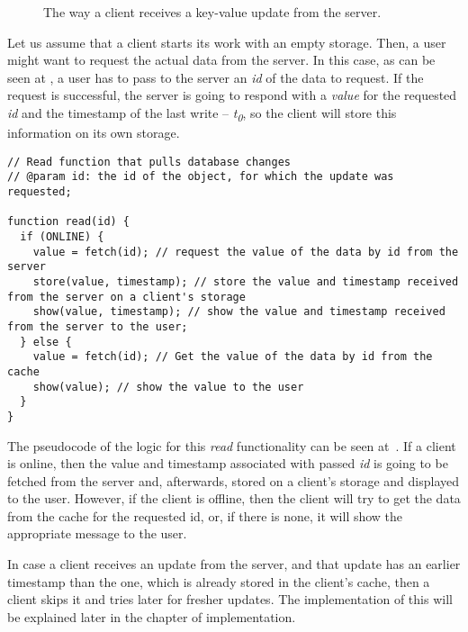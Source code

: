 \begin{figure}[!htb]
    \begin{center}
    \def\svgwidth{\linewidth}
    
    \caption {The way a client receives a key-value update from the server.}
    \label{fig:design2}
\end{center}
\end{figure}

Let us assume that a client starts its work with an empty storage. Then, a user might want to request the actual data from the server. In this case, as can be seen at , a user has to pass to the server an \textit{id} of the data to request. If the request is successful, the server is going to respond with a \textit{value} for the requested \textit{id} and the timestamp of the last write -- \textit{t\textsubscript{0}}, so the client will store this information on its own storage.

\begin{lstlisting}[caption={A pseudocode for requesting the data on a client's side.}, label={lst:read1}]
// Read function that pulls database changes
// @param id: the id of the object, for which the update was requested;

function read(id) {
  if (ONLINE) {
    value = fetch(id); // request the value of the data by id from the server
    store(value, timestamp); // store the value and timestamp received from the server on a client's storage
    show(value, timestamp); // show the value and timestamp received from the server to the user;
  } else {
    value = fetch(id); // Get the value of the data by id from the cache
    show(value); // show the value to the user
  }
}

\end{lstlisting} 

The pseudocode of the logic for this \textit{read} functionality can be seen at~. If a client is online, then the value and timestamp associated with passed \textit{id} is going to be fetched from the server and, afterwards, stored on a client's storage and displayed to the user. However, if the client is offline, then the client will try to get the data from the cache for the requested id, or, if there is none, it will show the appropriate message to the user.


In case a client receives an update from the server, and that update has an earlier timestamp than the one, which is already stored in the client's cache, then a client skips it and tries later for fresher updates. The implementation of this will be explained later in the chapter of implementation.

